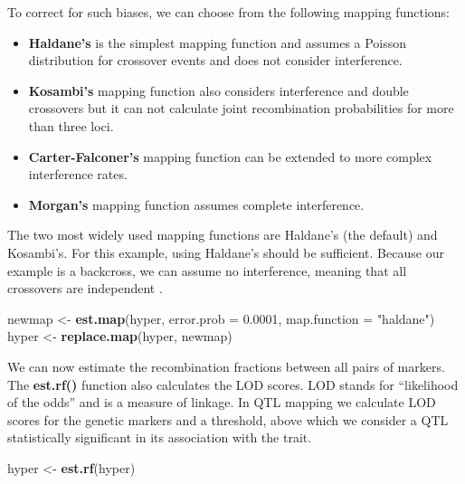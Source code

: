 \documentclass[12pt,]{krantz}
\makeatletter
\newenvironment{Shaded}{\begin{snugshade}}{\end{snugshade}}
\newcommand{\KeywordTok}[1]{\textcolor[rgb]{0.27,0.27,0.27}{\textbf{{#1}}}}
\newcommand{\DataTypeTok}[1]{\textcolor[rgb]{0.27,0.27,0.27}{{#1}}}
\newcommand{\FloatTok}[1]{\textcolor[rgb]{0.06,0.06,0.06}{{#1}}}
\newcommand{\StringTok}[1]{\textcolor[rgb]{0.5,0.5,0.5}{{#1}}}
\newcommand{\NormalTok}[1]{{#1}}
\providecommand{\tightlist}{%
  \setlength{\itemsep}{0pt}\setlength{\parskip}{0pt}}
\newenvironment{kframe}{%
\medskip{}
\setlength{\fboxsep}{.8em}
 \def\at@end@of@kframe{}%
 \ifinner\ifhmode%
  \def\at@end@of@kframe{\end{minipage}}%
  \begin{minipage}{\columnwidth}%
 \fi\fi%
 \def\FrameCommand##1{\hskip\@totalleftmargin \hskip-\fboxsep
 \colorbox{shadecolor}{##1}\hskip-\fboxsep
     \hskip-\linewidth \hskip-\@totalleftmargin \hskip\columnwidth}%
 \MakeFramed {\advance\hsize-\width
   \@totalleftmargin\z@ \linewidth\hsize
   \@setminipage}}%
 {\par\unskip\endMakeFramed%
 \at@end@of@kframe}
\renewenvironment{Shaded}{\begin{kframe}}{\end{kframe}}
\makeatother
\begin{document}
To correct for such biases, we can choose from the following mapping
functions:

\begin{itemize}
\tightlist
\item
  \textbf{Haldane's} is the simplest mapping function and assumes a
  Poisson distribution for crossover events and does not consider
  interference.
\item
  \textbf{Kosambi's} mapping function also considers interference and
  double crossovers but it can not calculate joint recombination
  probabilities for more than three loci.
\item
  \textbf{Carter-Falconer's} mapping function can be extended to more
  complex interference rates.
\item
  \textbf{Morgan's} mapping function assumes complete interference.
\end{itemize}

The two most widely used mapping functions are Haldane's (the default)
and Kosambi's. For this example, using Haldane's should be sufficient.
Because our example is a backcross, we can assume no interference,
meaning that all crossovers are independent \citep{lynch1998genetics}.

\begin{Shaded}
\begin{Highlighting}[]
\NormalTok{newmap <-}\StringTok{ }\KeywordTok{est.map}\NormalTok{(hyper, }\DataTypeTok{error.prob =} \FloatTok{0.0001}\NormalTok{, }\DataTypeTok{map.function =} \StringTok{"haldane"}\NormalTok{)}
\NormalTok{hyper <-}\StringTok{ }\KeywordTok{replace.map}\NormalTok{(hyper, newmap)}
\end{Highlighting}
\end{Shaded}

We can now estimate the recombination fractions between all pairs of
markers. The \textbf{est.rf()} function also calculates the LOD scores.
LOD stands for ``likelihood of the odds'' and is a measure of linkage.
In QTL mapping we calculate LOD scores for the genetic markers and a
threshold, above which we consider a QTL statistically significant in
its association with the trait.

\begin{Shaded}
\begin{Highlighting}[]
\NormalTok{hyper <-}\StringTok{ }\KeywordTok{est.rf}\NormalTok{(hyper)}
\end{Highlighting}
\end{Shaded}
\end{document}
